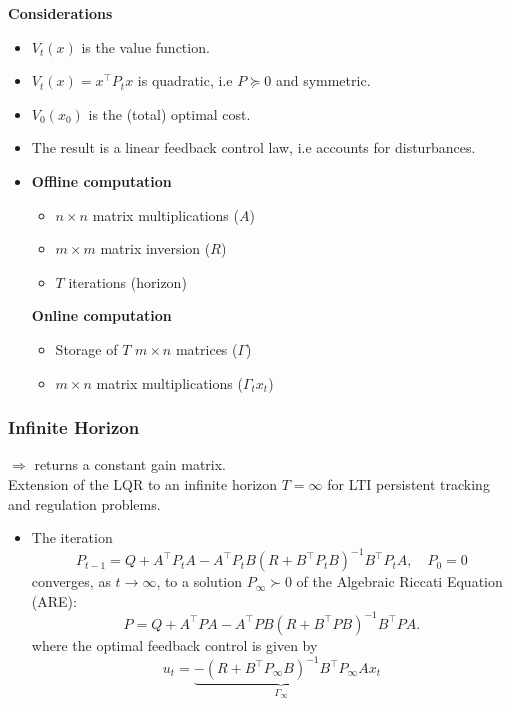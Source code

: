 \textbf{Considerations}
\begin{itemize}
    \item $V_t(x)$ is the value function.
    \item $V_t(x) = x^\top P_t x$ is quadratic, i.e $P \succeq 0$ and symmetric.
    \item $V_0(x_0)$ is the (total) optimal cost.
    \item The result is a linear feedback control law, i.e accounts for disturbances. 
    \item \begin{minipage}[t]{0.45\textwidth}
            \textbf{Offline computation}
            \begin{itemize}
                \item $n \times n$ matrix multiplications ($A$)
                \item $m \times m$ matrix inversion ($R$)
                \item $T$ iterations (horizon)
            \end{itemize}
         \end{minipage}\hfill
         \begin{minipage}[t]{0.45\textwidth}
            \textbf{Online computation}
            \begin{itemize}
                \item Storage of $T$ $m \times n$ matrices ($\Gamma$)
                \item $m \times n$ matrix multiplications ($\Gamma_t x_t$)
            \end{itemize}
        \end{minipage}
\end{itemize}

\newpage

\subsubsection*{Infinite Horizon}
$\Rightarrow$ returns a constant gain matrix.\\
Extension of the LQR to an infinite horizon $T = \infty$ for LTI persistent tracking and regulation problems.
\begin{itemize}
    \item The iteration 
    \begin{equation*}
        P_{t-1} = Q + A^\top P_t A - A^\top P_t B (R + B^\top P_t B)^{-1} B^\top P_t A, \quad P_0 = 0
    \end{equation*}
    converges, as \( t \to \infty \), to a solution \( P_\infty \succ 0 \) of the Algebraic Riccati Equation (ARE):
    \begin{equation*}
        P = Q + A^\top P A - A^\top P B (R + B^\top P B)^{-1} B^\top P A.
    \end{equation*}
    where the optimal feedback control is given by
    \begin{equation*}
        u_t = \underbrace{-(R + B^\top P_{\infty} B)^{-1} B^\top P_{\infty} A}_{\Gamma_\infty} x_t
    \end{equation*}
\end{itemize}

